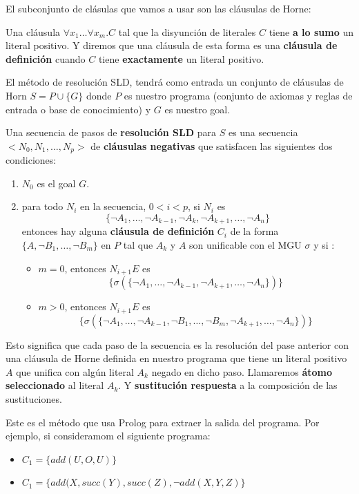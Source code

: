 El subconjunto de clásulas que vamos a usar son las cláusulas de Horne:

Una cláusula $\forall x_1\dots\forall x_m.C$ tal que la disyunción de literales $C$ tiene \textbf{a lo sumo} un literal positivo. Y diremos que una cláusula de esta forma es una \textbf{cláusula de definición} cuando $C$ tiene \textbf{exactamente} un literal positivo.

El método de resolución SLD, tendrá como entrada un conjunto de cláusulas de Horn $S = P\cup \{G\} $ donde $P$ es nuestro programa (conjunto de axiomas y reglas de entrada o base de conocimiento) y $G$ es nuestro goal.

Una secuencia de pasos de \textbf{resolución SLD} para $S$ es una secuencia $<N_0,N_1,\dots, N_p>$ de \textbf{cláusulas negativas} que satisfacen las siguientes dos condiciones:
\begin{enumerate}
\item $N_0$ es el goal $G$.
\item para todo $N_i$ en la secuencia, $0 < i < p$, si $N_i$ es 
$$\{\lnot A_1,\dots, \lnot A_{k-1}, \lnot A_{k}, \lnot A_{k+1},\dots, \lnot A_n\}$$
entonces hay alguna \textbf{cláusula de definición} $C_i$ de la forma $\{A,\lnot B_1,\dots, \lnot B_m\}$ en $P$ tal que $A_k$ y $A$ son unificable con el MGU $\sigma$ y si :
\begin{itemize}
\item $m = 0$, entonces $N_{i+1}E$ es
$$\{ \sigma(\{\lnot A_1,\dots, \lnot A_{k-1}, \lnot A_{k+1},\dots, \lnot A_n\}) \}$$
\item $m > 0$, entonces $N_{i+1}E$ es
$$\{ \sigma(\{\lnot A_1,\dots, \lnot A_{k-1}, \lnot B_1,\dots, \lnot B_m, \lnot A_{k+1},\dots, \lnot A_n\}) \}$$
\end{itemize}
\end{enumerate}

Esto significa que cada paso de la secuencia es la resolución del pase anterior con una cláusula de Horne definida en nuestro programa que tiene un literal positivo $A$ que unifica con algún literal $A_k$ negado en dicho paso. Llamaremos \textbf{átomo seleccionado} al literal $A_k$. Y \textbf{sustitución respuesta} a la composición de las sustituciones.

Este es el método que usa Prolog para extraer la salida del programa. Por ejemplo, si consideramom el siguiente programa:

\begin{itemize}
\item $C_1 = \{add(U,O,U)\}$
\item $C_1 = \{add(X,succ(Y),succ(Z), \lnot add(X,Y,Z)\}$
\end{itemize}

